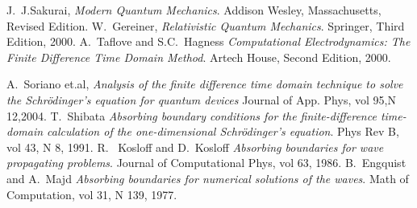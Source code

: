 \begin{thebibliography}{9}

  J.~J.Sakurai,
  \emph{Modern Quantum Mechanics}.
  Addison Wesley, Massachusetts,
  Revised Edition.
  W.~Gereiner,
  \emph{Relativistic Quantum Mechanics}.
  Springer,
  Third Edition,
  2000.
  A.~Taflove and S.C.~Hagness
  \emph{Computational Electrodynamics: The Finite Difference Time Domain Method}.
  Artech House,
  Second Edition, 2000.
  
  A.~Soriano et.al,
  \emph{Analysis of the finite difference time domain technique to solve the Schr\"odinger's equation for quantum devices}
  Journal of App. Phys,
  vol 95,N 12,2004.
  T.~Shibata
  \emph{Absorbing boundary conditions for the finite-difference time-domain calculation of the one-dimensional Schr\"odinger's equation}.
  Phys Rev B,
  vol 43, N 8, 1991.
 R.~ Kosloff and D.~Kosloff
  \emph{Absorbing boundaries for wave propagating problems}.
  Journal of Computational Phys,
  vol 63, 1986.
 B.~Engquist and A.~Majd
  \emph{Absorbing boundaries for numerical solutions of the waves}.
  Math of Computation,
  vol 31, N 139, 1977. 


\end{thebibliography}
